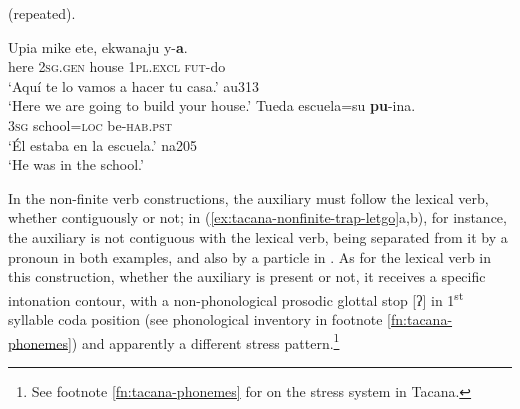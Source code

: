 \documentclass[output=paper]{langsci/langscibook}
\begin{document}
 (repeated).
%
\begin{exe}\ex
\label{ex:tacana-auxetymologies-build-school}  
\begin{xlist}
\ex\label{ex:tacana-auxetymologies-build}
\gll Upia  mike  ete,  ekwanaju  y-\textbf{a}.\\
    here  \textsc{2sg.gen}  house  \textsc{1pl.excl}  \textsc{fut}-do\\
\glt `Aquí te lo vamos a hacer tu casa.' au313\\
`Here we are going to build your house.'
\ex\label{ex:tacana-auxetymologies-school}
  \gll   Tueda  escuela=su  \textbf{pu}{-ina}.\\
    3\textsc{sg}  school=\textsc{loc}  be-\textsc{hab.pst}\\
\glt `Él estaba en la escuela.' na205\\
`He was in the school.'
\end{xlist}\end{exe}
%

In the non-finite verb constructions, the auxiliary must follow the lexical
verb, whether contiguously or not; in
(\ref{ex:tacana-nonfinite-trap-letgo}a,b), for instance, the auxiliary is
not contiguous with the lexical verb, being separated from it by a pronoun
in both examples, and also by a particle in .
As for the lexical verb in this construction, whether the auxiliary is
present or not, it receives a specific intonation contour, with a
non-phonological prosodic glottal stop [ʔ] in 1\textsuperscript{st}
syllable coda position (see phonological inventory in footnote
\ref{fn:tacana-phonemes}) and apparently a different stress
pattern.\footnote{See footnote \ref{fn:tacana-phonemes} for on the stress system in Tacana.}
\end{document}
